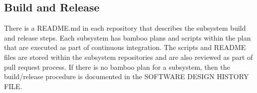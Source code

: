 \subsection{Build and Release}
There is a README.md in each repository that describes the subsystem \gls{build}
and release steps. Each subsystem has \gls{bamboo} plans and scripts within the
plan that are executed as part of continuous integration. The scripts and README files are
stored within the subsystem repositories and are also reviewed as part of pull
request process. If there is no \gls{bamboo} plan for a subsystem, then the
build/release procedure is documented in the SOFTWARE DESIGN HISTORY FILE. 
